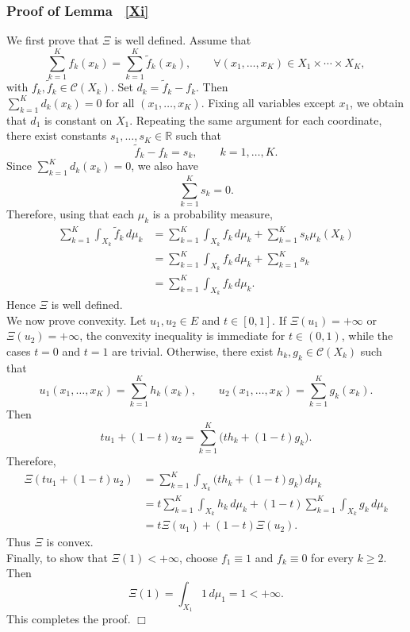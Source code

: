 \documentclass[twoside,11pt,a4paper]{article}
\newcommand*{\SavedRef}{}
\let\SavedRef\ref
\renewcommand*{\ref}[1]{  \begingroup
    \hypersetup{
      linkcolor=linkequation,
      linkbordercolor=linkequation,
    }    \SavedRef{#1}  \endgroup
}
\begin{document}
\subsubsection*{Proof of Lemma~\ref{Xi}}
We first prove that \(\Xi\) is well defined. Assume that
\[
\sum_{k=1}^K f_k(x_k)
=
\sum_{k=1}^K \widetilde f_k(x_k),
\qquad
\forall (x_1,\dots,x_K)\in X_1\times\cdots\times X_K,
\]
with \(f_k,\widetilde f_k\in\mathcal C(X_k)\). Set $
d_k=\widetilde f_k-f_k$.
Then $
\sum_{k=1}^K d_k(x_k)=0
\text{ for all }(x_1,\dots,x_K)$.
Fixing all variables except \(x_1\), we obtain that \(d_1\) is constant on
\(X_1\). Repeating the same argument for each coordinate, there exist constants
\(s_1,\dots,s_K\in\mathbb R\) such that
\[
\widetilde f_k-f_k=s_k,
\qquad k=1,\dots,K.
\]
Since \(\sum_{k=1}^K d_k(x_k)=0\), we also have
\[
\sum_{k=1}^K s_k=0.
\]
Therefore, using that each \(\mu_k\) is a probability measure,
\[
\begin{aligned}
\sum_{k=1}^K \int_{X_k} \widetilde f_k\,d\mu_k
&=
\sum_{k=1}^K \int_{X_k} f_k\,d\mu_k
+
\sum_{k=1}^K s_k \mu_k(X_k) \\
&=
\sum_{k=1}^K \int_{X_k} f_k\,d\mu_k
+
\sum_{k=1}^K s_k \\
&=
\sum_{k=1}^K \int_{X_k} f_k\,d\mu_k .
\end{aligned}
\]
Hence \(\Xi\) is well defined.\\
We now prove convexity. Let \(u_1,u_2\in E\) and \(t\in[0,1]\). If
\(\Xi(u_1)=+\infty\) or \(\Xi(u_2)=+\infty\), the convexity inequality is
immediate for \(t\in(0,1)\), while the cases \(t=0\) and \(t=1\) are trivial.
Otherwise, there exist \(h_k,g_k\in\mathcal C(X_k)\) such that
\[
u_1(x_1,\dots,x_K)=\sum_{k=1}^K h_k(x_k),
\qquad
u_2(x_1,\dots,x_K)=\sum_{k=1}^K g_k(x_k).
\]
Then
\[
tu_1+(1-t)u_2
=
\sum_{k=1}^K \bigl(th_k+(1-t)g_k\bigr).
\]
Therefore,
\[
\begin{aligned}
\Xi(tu_1+(1-t)u_2)
&=
\sum_{k=1}^K
\int_{X_k}\bigl(th_k+(1-t)g_k\bigr)\,d\mu_k \\
&=
t\sum_{k=1}^K \int_{X_k} h_k\,d\mu_k
+
(1-t)\sum_{k=1}^K \int_{X_k} g_k\,d\mu_k \\
&=
t\Xi(u_1)+(1-t)\Xi(u_2).
\end{aligned}
\]
Thus \(\Xi\) is convex.\\
Finally, to show that \(\Xi(1)<+\infty\), choose \(f_1\equiv 1\) and
\(f_k\equiv 0\) for every \(k\ge 2\). Then
\[
\Xi(1)=\int_{X_1}1\,d\mu_1=1<+\infty.
\]
This completes the proof.
\hfill\(\Box\)
\end{document}
